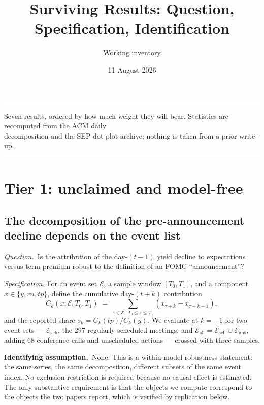 \documentclass[11pt]{article}
\title{\vspace{-2.2em}\textbf{Surviving Results: Question, Specification, Identification}}
\author{Working inventory}
\date{11 August 2026}
\newcommand{\qq}[1]{\vspace{0.3em}\noindent\textit{Question.}\ #1}
\newcommand{\ia}[1]{\vspace{0.4em}\noindent\textbf{Identifying assumption.}\ #1}
\begin{document}
\maketitle\vspace{-1.6em}

\noindent\rule{\textwidth}{0.4pt}
\begin{center}\small
Seven results, ordered by how much weight they will bear. Statistics are recomputed from the ACM daily\\ decomposition and the SEP dot-plot archive; nothing is taken from a prior write-up.
\end{center}
\noindent\rule{\textwidth}{0.4pt}

\section{Tier 1: unclaimed and model-free}

\subsection{The decomposition of the pre-announcement decline depends on the event list}

\qq{Is the attribution of the day-$(t\!-\!1)$ yield decline to expectations versus term premium robust to the definition of an FOMC ``announcement''?}

\vspace{0.4em}\noindent\textit{Specification.} For an event set $\mathcal E$, a sample window $[T_0,T_1]$, and a component $x\in\{y,rn,tp\}$, define the cumulative day-$(t+k)$ contribution
\begin{equation}
C_k(x;\mathcal E,T_0,T_1)\;=\;\sum_{\tau\in\mathcal E,\;T_0\le\tau\le T_1}\left(x_{\tau+k}-x_{\tau+k-1}\right),
\end{equation}
and the reported share $s_k=C_k(tp)/C_k(y)$. We evaluate at $k=-1$ for two event sets --- $\mathcal E_{\text{sch}}$, the 297 regularly scheduled meetings, and $\mathcal E_{\text{all}}=\mathcal E_{\text{sch}}\cup\mathcal E_{\text{uns}}$, adding 68 conference calls and unscheduled actions --- crossed with three samples.

\ia{None. This is a within-model robustness statement: the same series, the same decomposition, different subsets of the same event index. No exclusion restriction is required because no causal effect is estimated. The only substantive requirement is that the objects we compute correspond to the objects the two papers report, which is verified by replication below.}
\end{document}
